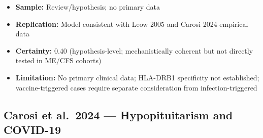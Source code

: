 \begin{description}
\begin{itemize}
        \item \textbf{Sample:} Review/hypothesis; no primary data
        \item \textbf{Replication:} Model consistent with Leow 2005 and Carosi 2024 empirical data
        \item \textbf{Certainty:} 0.40 (hypothesis-level; mechanistically coherent but not directly tested in ME/CFS cohorts)
        \item \textbf{Limitation:} No primary clinical data; HLA-DRB1 specificity not established; vaccine-triggered cases require separate consideration from infection-triggered
    \end{itemize}
\end{description}

\subsection{Carosi et al.\ 2024 --- Hypopituitarism and COVID-19}

